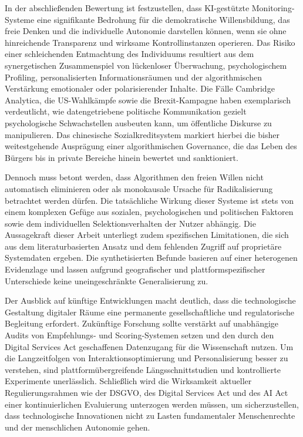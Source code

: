 In der abschließenden Bewertung ist festzustellen, dass \ac{KI}-gestützte Monitoring-Systeme eine signifikante Bedrohung für die demokratische Willensbildung, das freie Denken und die individuelle Autonomie darstellen können, wenn sie ohne hinreichende Transparenz und wirksame Kontrollinstanzen operieren. Das Risiko einer schleichenden Entmachtung des Individuums resultiert aus dem synergetischen Zusammenspiel von lückenloser Überwachung, psychologischem Profiling, personalisierten Informationsräumen und der algorithmischen Verstärkung emotionaler oder polarisierender Inhalte. Die Fälle Cambridge Analytica, die US-Wahlkämpfe sowie die Brexit-Kampagne haben exemplarisch verdeutlicht, wie datengetriebene politische Kommunikation gezielt psychologische Schwachstellen ausbeuten kann, um öffentliche Diskurse zu manipulieren. Das chinesische Sozialkreditsystem markiert hierbei die bisher weitestgehende Ausprägung einer algorithmischen Governance, die das Leben des Bürgers bis in private Bereiche hinein bewertet und sanktioniert.

Dennoch muss betont werden, dass Algorithmen den freien Willen nicht automatisch eliminieren oder als monokausale Ursache für Radikalisierung betrachtet werden dürfen. Die tatsächliche Wirkung dieser Systeme ist stets von einem komplexen Gefüge aus sozialen, psychologischen und politischen Faktoren sowie dem individuellen Selektionsverhalten der Nutzer abhängig. Die Aussagekraft dieser Arbeit unterliegt zudem spezifischen Limitationen, die sich aus dem literaturbasierten Ansatz und dem fehlenden Zugriff auf proprietäre Systemdaten ergeben. Die synthetisierten Befunde basieren auf einer heterogenen Evidenzlage und lassen aufgrund geografischer und plattformspezifischer Unterschiede keine uneingeschränkte Generalisierung zu.

Der Ausblick auf künftige Entwicklungen macht deutlich, dass die technologische Gestaltung digitaler Räume eine permanente gesellschaftliche und regulatorische Begleitung erfordert. Zukünftige Forschung sollte verstärkt auf unabhängige Audits von Empfehlungs- und Scoring-Systemen setzen und den durch den Digital Services Act geschaffenen Datenzugang für die Wissenschaft nutzen. Um die Langzeitfolgen von Interaktionsoptimierung und Personalisierung besser zu verstehen, sind plattformübergreifende Längsschnittstudien und kontrollierte Experimente unerlässlich. Schließlich wird die Wirksamkeit aktueller Regulierungsrahmen wie der \ac{DSGVO}, des Digital Services Act und des \ac{AI} Act einer kontinuierlichen Evaluierung unterzogen werden müssen, um sicherzustellen, dass technologische Innovationen nicht zu Lasten fundamentaler Menschenrechte und der menschlichen Autonomie gehen.

